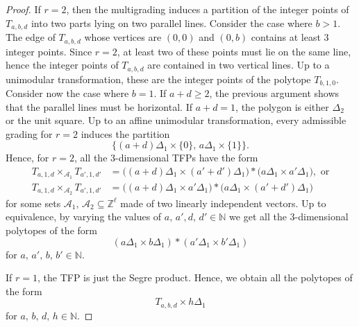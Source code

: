 \documentclass[12pt,reqno]{amsart}   	%
\theoremstyle{plain}
\theoremstyle{definition}
\theoremstyle{remark}
\newcommand{\Z}{\mathbb{Z}}
\begin{document}
\begin{proof}
    If $r=2$, then the multigrading induces a partition of the integer points of $T_{a,b,d}$ into two parts lying on two parallel lines. 
    Consider the case where $b > 1$. The edge of $T_{a,b,d}$ whose vertices are $(0,0)$ and $(0,b)$ contains at least $3$ integer points. Since $r=2$, at least two of these points must lie on the same line, hence the integer points of $T_{a,b,d}$ are contained in two vertical lines. Up to a unimodular transformation, these are the integer points of the polytope $T_{b,1,0}$. 
    Consider now the case where $b=1$. If $a+d \geq 2$, the previous argument shows that the parallel lines must be horizontal. If $a+d=1$, the polygon is either $\Delta_2$ or the unit square.
    Up to an affine unimodular transformation, every admissible grading for $r=2$ induces the partition
    \[
   \Big\{(a+d)\Delta_1\times\{0\},\,a\Delta_1\times\{1\} \Big\}.
    \]
    Hence, for $r=2$, all the $3$-dimensional TFPs have the form
    \begin{align*}
    T_{a,1,d} \times_{\mathcal{A}_1} T_{a',1,d'} &= \Big( (a+d)\Delta_1 \times (a'+d')\Delta_1 \Big)* \Big( a\Delta_1 \times a'\Delta_1 \Big), \text{ or}\\
    T_{a,1,d} \times_{\mathcal{A}_2} T_{a',1,d'} &= \Big( (a+d)\Delta_1 \times a'\Delta_1 \Big) * \Big( a\Delta_1 \times (a'+d')\Delta_1 \Big)
    \end{align*}
    for some sets $\mathcal{A}_1,\,\mathcal{A}_2 \subseteq \Z^{\ell}$ made of two linearly independent vectors.
    Up to equivalence, by varying the values of $a,\,a',d,\,d' \in \mathbb{N}$ we get all the $3$-dimensional polytopes of the form 
    \[
    \left( a\Delta_1 \times b\Delta_1\right) * \left( a'\Delta_1 \times b'\Delta_1    \right) 
    \]
    for $a,\,a',\,b,\,b' \in \mathbb{N}$.

    If $r=1$, the TFP is just the Segre product. Hence, we obtain all the polytopes of the form
    \[
    T_{a,b,d}\times h\Delta_1 
    \]
    for $a,\,b,\,d,\,h \in \mathbb{N}$.
\end{proof}
\end{document}
